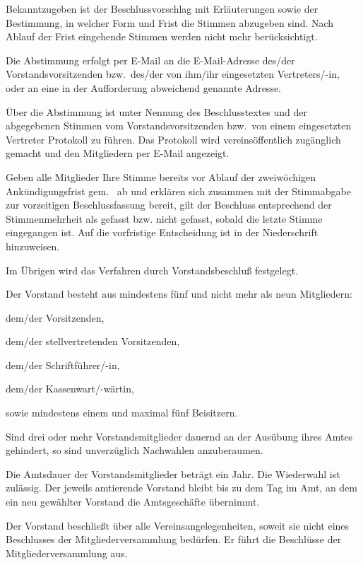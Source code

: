 \documentclass[draft]{scrartcl}
\begin{document}
\begin{contract}
Bekanntzugeben ist der Beschlussvorschlag mit Erläuterungen sowie der
Bestimmung, in welcher Form und Frist die Stimmen abzugeben sind. Nach Ablauf
der Frist eingehende Stimmen werden nicht mehr berücksichtigt.

Die Abstimmung erfolgt per E-Mail an die E-Mail-Adresse des/der
Vorstandsvorsitzenden bzw.\ des/der von ihm/ihr eingesetzten Vertreters/-in,
oder an eine in der Auf\/forderung abweichend genannte Adresse.

Über die Abstimmung ist unter Nennung des Beschlusstextes und der abgegebenen
Stimmen vom Vorstandsvorsitzenden bzw.\ von einem eingesetzten Vertreter
Protokoll zu führen. Das Protokoll wird vereinsöffentlich zugänglich gemacht
und den Mitgliedern per E-Mail angezeigt.

Geben alle Mitglieder Ihre Stimme bereits vor Ablauf der zweiwöchigen
An\-kün\-di\-gungs\-frist gem.~ ab und erklären sich
zusammen mit der Stimmabgabe zur vorzeitigen Beschlussfassung bereit, gilt der
Beschluss entsprechend der Stimmenmehrheit als gefasst bzw. nicht gefasst, sobald
die letzte Stimme eingegangen ist. Auf die vorfristige Entscheidung ist in der
Niederschrift hinzuweisen.

Im Übrigen wird das Verfahren durch Vorstandsbeschluß festgelegt.


Der Vorstand besteht aus mindestens fünf und nicht mehr als neun Mitgliedern:
\begin{compactenum}[\hspace{2em}1.]
  \item dem/der Vorsitzenden,
  \item dem/der stellvertretenden Vorsitzenden,
  \item dem/der Schriftführer/-in,
  \item dem/der Kassenwart/-wärtin,
  \item sowie mindestens einem und maximal fünf Beisitzern.
\end{compactenum}

Sind drei oder mehr Vorstandsmitglieder dauernd an der Ausübung ihres Amtes
gehindert, so sind unverzüglich Nachwahlen anzuberaumen.

Die Amtsdauer der Vorstandsmitglieder beträgt ein Jahr. Die Wiederwahl ist
zulässig. Der jeweils amtierende Vorstand bleibt bis zu dem Tag im Amt, an dem
ein neu gewählter Vorstand die Amtsgeschäfte übernimmt.

Der Vorstand beschließt über alle Vereinsangelegenheiten, soweit sie nicht
eines Beschlusses der Mitgliederversammlung bedürfen. Er führt die Beschlüsse
der Mitgliederversammlung aus.


\end{contract}
\end{document}
